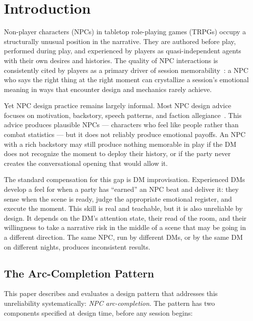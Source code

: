 
\section{Introduction}
\label{sec:introduction}

Non-player characters (NPCs) in tabletop role-playing games (TRPGs) occupy
a structurally unusual position in the narrative. They are authored before
play, performed during play, and experienced by players as quasi-independent
agents with their own desires and histories. The quality of NPC interactions
is consistently cited by players as a primary driver of session
memorability~\cite{bowman2010functions, tychsen2006role}: a NPC who says
the right thing at the right moment can crystallize a session's emotional
meaning in ways that encounter design and mechanics rarely achieve.

Yet NPC design practice remains largely informal. Most NPC design advice
focuses on motivation, backstory, speech patterns, and faction
allegiance~\cite{dungeons2014players}. This advice produces plausible NPCs ---
characters who feel like people rather than combat statistics --- but it does
not reliably produce emotional payoffs. An NPC with a rich backstory may still
produce nothing memorable in play if the DM does not recognize the moment to
deploy their history, or if the party never creates the conversational opening
that would allow it.

The standard compensation for this gap is DM improvisation. Experienced DMs
develop a feel for when a party has ``earned'' an NPC beat and deliver it:
they sense when the scene is ready, judge the appropriate emotional register,
and execute the moment. This skill is real and teachable, but it is also
unreliable by design. It depends on the DM's attention state, their read of
the room, and their willingness to take a narrative risk in the middle of a
scene that may be going in a different direction. The same NPC, run by
different DMs, or by the same DM on different nights, produces inconsistent
results.

\subsection{The Arc-Completion Pattern}

This paper describes and evaluates a design pattern that addresses this
unreliability systematically: \textit{NPC arc-completion}. The pattern
has two components specified at design time, before any session begins:

